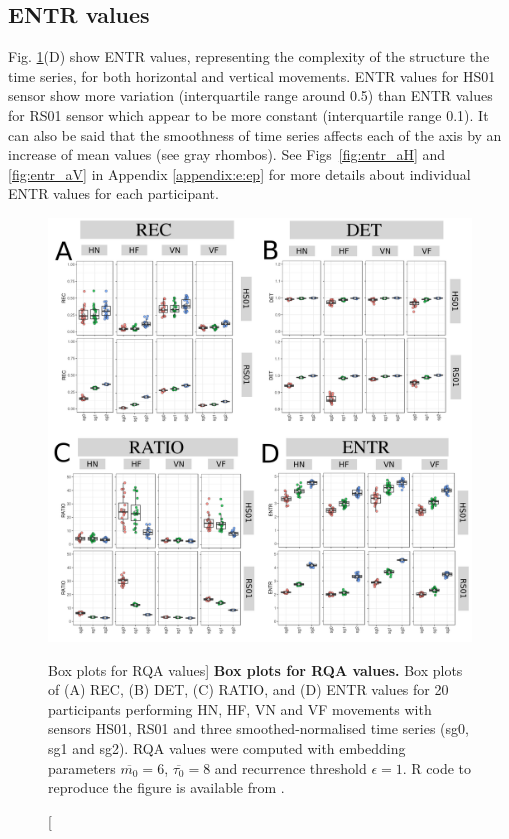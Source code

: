 \subsection*{ENTR values}
Fig. \ref{fig:RQABP}(D) show ENTR values, representing the complexity of 
the structure the time series, for both horizontal and vertical movements.
ENTR values for HS01 sensor show more variation 
(interquartile range around 0.5)
than ENTR values for RS01 sensor which appear 
to be more constant (interquartile range 0.1).
It can also be said that the smoothness of time series affects
each of the axis by an increase of mean values (see gray rhombos).
See Figs~\ref{fig:entr_aH} and \ref{fig:entr_aV} in Appendix
\ref{appendix:e:ep}
for more details about individual ENTR values for each participant.

\begin{figure}
\centering
\includegraphics[width=1.0\textwidth]{fig_6_08}
    \caption
	[Box plots for RQA values]{
	{\bf Box plots for RQA values.}
	Box plots of (A) REC, (B) DET, (C) RATIO, and (D) ENTR values 
	for 20 participants performing HN, HF, VN and VF movements
	with sensors HS01, RS01 and three smoothed-normalised  
	time series (sg0, sg1 and sg2).
	RQA values were computed with 
	embedding parameters $\overline{m_0}=6$, $\overline{\tau_0}=8$ and
	recurrence threshold $\epsilon=1$.
	R code to reproduce the figure is available from \cite{hwum2018}.
        }
    \label{fig:RQABP}
\end{figure}


